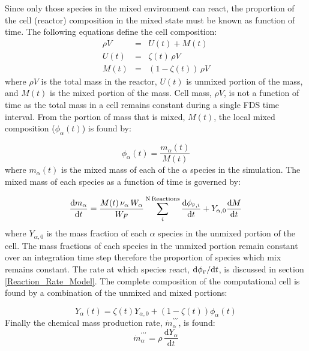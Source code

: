 Since only those species in the mixed environment can react, the proportion of the cell (reactor) composition in the mixed state must be known as function of time. The following equations define the cell composition:
\begin{eqnarray}\label{eq:mixunmix}
\rho V &=& U(t) + M(t) \\
U(t) &=& \zeta(t)\,\rho V \\
M(t) &=& (1-\zeta(t))\,\rho V
\end{eqnarray} 
where $\rho V$ is the total mass in the reactor, $U(t)$ is unmixed portion of the mass, and $M(t)$ is the mixed portion of the mass. Cell mass, $\rho V$, is not a function of time as the total mass in a cell remains constant during a single FDS time interval. From the portion of mass that is mixed, $M(t)$, the local mixed composition ($\phi_{\alpha}(t)$) is found by:

\begin{equation}\label{eq:phi}
\phi_{\alpha}(t)=\frac{m_{\alpha}(t)}{M(t)}
\end{equation}
where $m_\alpha(t)$ is the mixed mass of each of the $\alpha$ species in the simulation. The mixed mass of each species as a function of time is governed by:

\begin{equation}\label{eq:mixmass}
\frac{\mbox{d}m_{\alpha}}{\mbox{d}t}=\frac{M(t) \, \nu_{\alpha} \, W_{\alpha}}{W_F}\displaystyle \sum_{i}^{\text{N\,Reactions}}\frac{\mbox{d}\phi_{{\tiny \hbox{F}},i}}{\mbox{d}t}+Y_{\alpha,0}\frac{\mbox{d}M}{\mbox{d}t} 
\end{equation}
where $Y_{\alpha,0}$ is the mass fraction of each $\alpha$ species in the unmixed portion of the cell. The mass fractions of each species in the unmixed portion remain constant over an integration time step therefore the proportion of species which mix remains constant. The rate at which species react, $\mbox{d}\phi_{\tiny \hbox{F}}/\mbox{d}t$, is discussed in section \ref{Reaction_Rate_Model}. The complete composition of the computational cell is found by a combination of the unmixed and mixed portions:

\begin{equation}\label{eq:final_comp}
Y_{\alpha}(t)=\zeta(t)Y_{\alpha,0}+(1-\zeta(t))\phi_{\alpha}(t)
\end{equation}
Finally the chemical mass production rate, $\dot{m}^{\prime\prime\prime}_{\alpha}$, is found:
\begin{equation}\label{mass_prod_rate}
\dot{m}^{\prime\prime\prime}_{\alpha}=\rho \,\frac{\mbox{d}Y_{\alpha}}{\mbox{d}t}
\end{equation}

